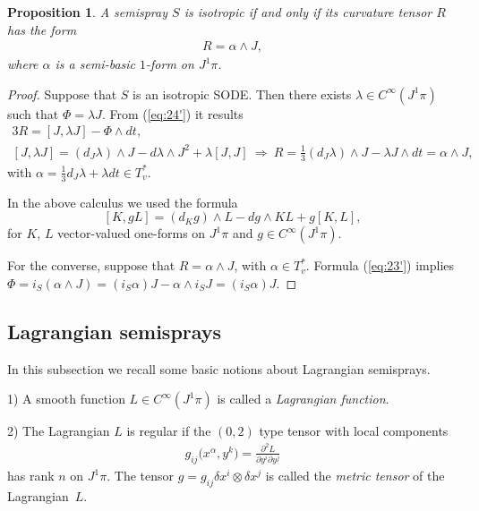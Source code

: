 \documentclass[11pt]{article}
\newtheorem{proposition}{Proposition}
\begin{document}
\begin{proposition}
\label{prop:iso} A semispray $S$ is isotropic if and only if its
curvature tensor $R$ has the form
\begin{gather*}
R=\alpha\wedge J,%
\end{gather*}
 where $\alpha$ is a semi-basic $1$-form on $J^{1}\pi$.
\end{proposition}

\begin{proof}
Suppose that $S$ is an isotropic SODE. Then there exists $\lambda\in C^{\infty}(J^{1}\pi)$
such that $\Phi=\lambda J$. From (\ref{eq:24'}) it results
\begin{gather*}
3R   =   [J,\lambda J]-\Phi\wedge dt,\\
{}[J,\lambda J]   =   \left(d_{J}\lambda\right)\wedge J-d\lambda\wedge J^{2}+\lambda[J,J] \ \Rightarrow \
R   =   \frac{1}{3}\left(d_{J}\lambda\right)\wedge J-\lambda J\wedge dt=\alpha\wedge J,
\end{gather*}
 with $\alpha=\frac{1}{3}d_{J}\lambda+\lambda dt\in T_{v}^{*}$.

In the above calculus we used the formula \cite{grifone00}\[
[K,gL]= (d_{K}g )\wedge L-dg\wedge KL+g[K,L],\]
 for $K$, $L$ vector-valued one-forms on $J^{1}\pi$ and $g\in C^{\infty}(J^{1}\pi)$.

For the converse, suppose that $R=\alpha\wedge J$, with $\alpha\in T_{v}^{*}$.
Formula (\ref{eq:23'}) implies $\Phi=i_{S} (\alpha\wedge J )= (i_{S}\alpha )J-\alpha\wedge i_{S}J= (i_{S}\alpha )J$.
\end{proof}


\subsection{Lagrangian semisprays}

In this subsection we recall some basic notions about Lagrangian semisprays.

\begin{definition}\null \qquad

1) A smooth function $L\in C^{\infty}(J^{1}\pi)$ is called a \emph{Lagrangian
function}.

2) The Lagrangian $L$ is regular if the $(0,2)$ type tensor with
local components
\begin{gather*}
g_{ij}\big(x^{\alpha},y^{k}\big)=\frac{\partial^{2}L}{\partial y^{i}\partial y^{j}}%
\end{gather*}
has rank $n$ on $J^{1}\pi$. The tensor $g=g_{ij}\delta x^{i}\otimes\delta x^{j}$
is called the \emph{metric tensor} of the Lagrangian~$L$.
\end{definition}
\end{document}
